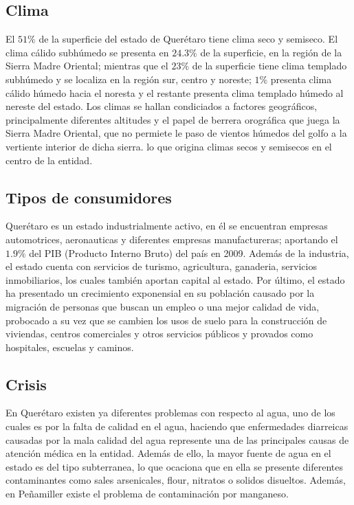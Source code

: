 \documentclass[letterpaper,12pt,oneside]{book}
\begin{document}
        \subsection{Clima}
            El $51\%$ de la superficie del estado de Querétaro tiene clima seco y semiseco. El clima cálido subhúmedo se presenta en $24.3\%$ de la superficie, en la región de la Sierra Madre Oriental; mientras que el $23\%$ de la superficie tiene clima templado subhúmedo y se localiza en la región sur, centro y noreste; $1\%$ presenta clima cálido húmedo hacia el noresta y el restante presenta clima templado húmedo al nereste del estado.
            Los climas se hallan condiciados a factores geográficos, principalmente diferentes altitudes y el papel de berrera orográfica que juega la Sierra Madre Oriental, que no permiete le paso de vientos húmedos del golfo a la vertiente interior de dicha sierra. lo que origina climas secos y semisecos en el centro de la entidad.
        \subsection{Tipos de consumidores}
            Querétaro es un estado industrialmente activo, en él se encuentran empresas automotrices, aeronauticas y diferentes empresas manufactureras; aportando el $1.9\%$ del PIB (Producto Interno Bruto) del país en 2009. 
            Además de la industria, el estado cuenta con servicios de turismo, agricultura, ganaderia, servicios inmobiliarios, los cuales también aportan capital al estado.
            Por último, el estado ha presentado un crecimiento exponensial en su población causado por la migración de personas que buscan un empleo o una mejor calidad de vida, probocado a su vez que se cambien los usos de suelo para la construcción de viviendas, centros comerciales y otros servicios públicos y provados como hospitales, escuelas y caminos.
        \subsection{Crisis}
            En Querétaro existen ya diferentes problemas con respecto al agua, uno de los cuales es por la falta de calidad en el agua, haciendo que enfermedades diarreicas causadas por la mala calidad del agua represente una de las principales causas de atención médica en la entidad.
            Además de ello, la mayor fuente de agua en el estado es del tipo subterranea, lo que ocaciona que en ella se presente diferentes contaminantes como sales arsenicales, flour, nitratos o solidos disueltos. Además, en Peñamiller existe el problema de contaminación por manganeso.
            
\end{document}
